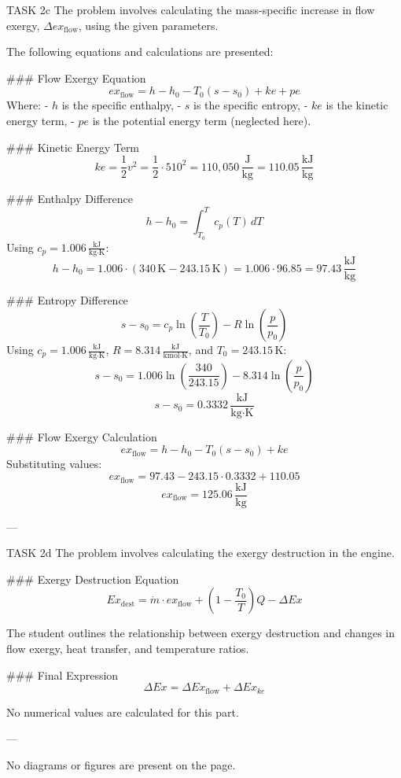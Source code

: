 TASK 2c  
The problem involves calculating the mass-specific increase in flow exergy, \( \Delta ex_{\text{flow}} \), using the given parameters.  

The following equations and calculations are presented:  

### Flow Exergy Equation  
\[
ex_{\text{flow}} = h - h_0 - T_0 (s - s_0) + ke + pe
\]  
Where:  
- \( h \) is the specific enthalpy,  
- \( s \) is the specific entropy,  
- \( ke \) is the kinetic energy term,  
- \( pe \) is the potential energy term (neglected here).  

### Kinetic Energy Term  
\[
ke = \frac{1}{2} v^2 = \frac{1}{2} \cdot 510^2 = 110,050 \, \frac{\text{J}}{\text{kg}} = 110.05 \, \frac{\text{kJ}}{\text{kg}}
\]  

### Enthalpy Difference  
\[
h - h_0 = \int_{T_0}^{T} c_p(T) \, dT
\]  
Using \( c_p = 1.006 \, \frac{\text{kJ}}{\text{kg·K}} \):  
\[
h - h_0 = 1.006 \cdot (340 \, \text{K} - 243.15 \, \text{K}) = 1.006 \cdot 96.85 = 97.43 \, \frac{\text{kJ}}{\text{kg}}
\]  

### Entropy Difference  
\[
s - s_0 = c_p \ln \left( \frac{T}{T_0} \right) - R \ln \left( \frac{p}{p_0} \right)
\]  
Using \( c_p = 1.006 \, \frac{\text{kJ}}{\text{kg·K}} \), \( R = 8.314 \, \frac{\text{kJ}}{\text{kmol·K}} \), and \( T_0 = 243.15 \, \text{K} \):  
\[
s - s_0 = 1.006 \ln \left( \frac{340}{243.15} \right) - 8.314 \ln \left( \frac{p}{p_0} \right)
\]  
\[
s - s_0 = 0.3332 \, \frac{\text{kJ}}{\text{kg·K}}
\]  

### Flow Exergy Calculation  
\[
ex_{\text{flow}} = h - h_0 - T_0 (s - s_0) + ke
\]  
Substituting values:  
\[
ex_{\text{flow}} = 97.43 - 243.15 \cdot 0.3332 + 110.05
\]  
\[
ex_{\text{flow}} = 125.06 \, \frac{\text{kJ}}{\text{kg}}
\]  

---

TASK 2d  
The problem involves calculating the exergy destruction in the engine.  

### Exergy Destruction Equation  
\[
Ex_{\text{dest}} = \dot{m} \cdot ex_{\text{flow}} + \left( 1 - \frac{T_0}{T} \right) Q - \Delta Ex
\]  

The student outlines the relationship between exergy destruction and changes in flow exergy, heat transfer, and temperature ratios.  

### Final Expression  
\[
\Delta Ex = \Delta Ex_{\text{flow}} + \Delta Ex_{ke}
\]  

No numerical values are calculated for this part.  

---

No diagrams or figures are present on the page.